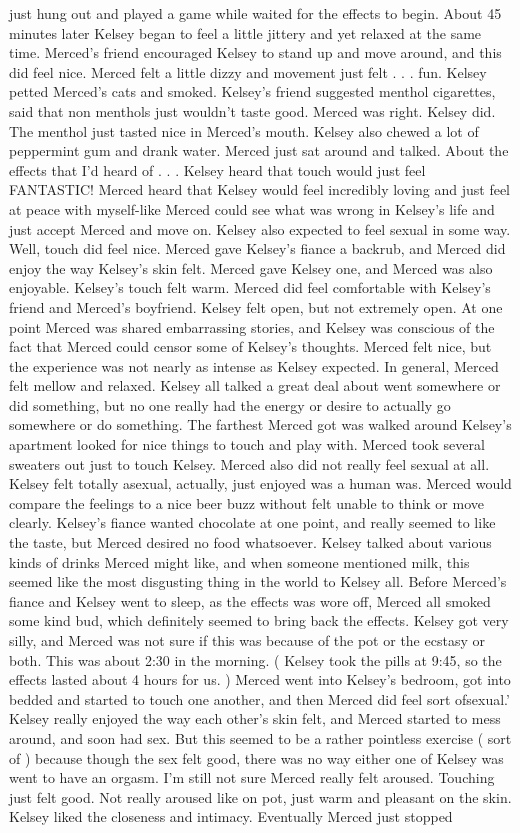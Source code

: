 \documentclass[12pt]{book}
\begin{document}
just hung out and played a game while waited for the effects to begin. About 45 minutes later Kelsey began to feel a little jittery and yet relaxed at the same time. Merced's friend encouraged Kelsey to stand up and move around, and this did feel nice. Merced felt a little dizzy and movement just felt . . .  fun. Kelsey petted Merced's cats and smoked. Kelsey's friend suggested menthol cigarettes, said that non menthols just wouldn't taste good. Merced was right. Kelsey did. The menthol just tasted nice in Merced's mouth. Kelsey also chewed a lot of peppermint gum and drank water. Merced just sat around and talked. About the effects that I'd heard of . . .  Kelsey heard that touch would just feel FANTASTIC! Merced heard that Kelsey would feel incredibly loving and just feel at peace with myself-like Merced could see what was wrong in Kelsey's life and just accept Merced and move on. Kelsey also expected to feel sexual in some way. Well, touch did feel nice. Merced gave Kelsey's fiance a backrub, and Merced did enjoy the way Kelsey's skin felt. Merced gave Kelsey one, and Merced was also enjoyable. Kelsey's touch felt warm. Merced did feel comfortable with Kelsey's friend and Merced's boyfriend. Kelsey felt open, but not extremely open. At one point Merced was shared embarrassing stories, and Kelsey was conscious of the fact that Merced could censor some of Kelsey's thoughts. Merced felt nice, but the experience was not nearly as intense as Kelsey expected. In general, Merced felt mellow and relaxed. Kelsey all talked a great deal about went somewhere or did something, but no one really had the energy or desire to actually go somewhere or do something. The farthest Merced got was walked around Kelsey's apartment looked for nice things to touch and play with. Merced took several sweaters out just to touch Kelsey. Merced also did not really feel sexual at all. Kelsey felt totally asexual, actually, just enjoyed was a human was. Merced would compare the feelings to a nice beer buzz without felt unable to think or move clearly. Kelsey's fiance wanted chocolate at one point, and really seemed to like the taste, but Merced desired no food whatsoever. Kelsey talked about various kinds of drinks Merced might like, and when someone mentioned milk, this seemed like the most disgusting thing in the world to Kelsey all. Before Merced's fiance and Kelsey went to sleep, as the effects was wore off, Merced all smoked some kind bud, which definitely seemed to bring back the effects. Kelsey got very silly, and Merced was not sure if this was because of the pot or the ecstasy or both. This was about 2:30 in the morning. ( Kelsey took the pills at 9:45, so the effects lasted about 4 hours for us. ) Merced went into Kelsey's bedroom, got into bedded and started to touch one another, and then Merced did feel sort ofsexual.' Kelsey really enjoyed the way each other's skin felt, and Merced started to mess around, and soon had sex. But this seemed to be a rather pointless exercise ( sort of ) because though the sex felt good, there was no way either one of Kelsey was went to have an orgasm. I'm still not sure Merced really felt aroused. Touching just felt good. Not really aroused like on pot, just warm and pleasant on the skin. Kelsey liked the closeness and intimacy. Eventually Merced just stopped 
\end{document}
